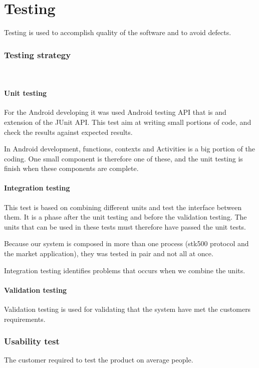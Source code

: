 \chapter{Testing}
	Testing is used to accomplish quality of the software and to avoid defects.
	
	\subsection{Testing strategy}
	\\
		\subsubsection{Unit testing}
			For the Android developing it was used Android testing API that is and extension of the JUnit API.
			This test aim at writing small portions of code, and check the results against expected results.

			In Android development, functions, contexts and Activities is a big portion of the coding.
			One small component is therefore one of these, and the unit testing is finish when these components are complete.

		\subsubsection{Integration testing}
			This test is based on combining different units and test the interface between them. It is a phase after the unit testing and before the validation testing. The units that can be used in these tests must therefore have passed the unit tests.

			Because our system is composed in more than one process (stk500 protocol and the market application), they 
			was tested in pair and not all at once.

			Integration testing identifies problems that occurs when we combine the units.

		\subsubsection{Validation testing}
			Validation testing is used for validating that the system have met the customers requirements.

	\subsection{Usability test}
		The customer required to test the product on average people.

